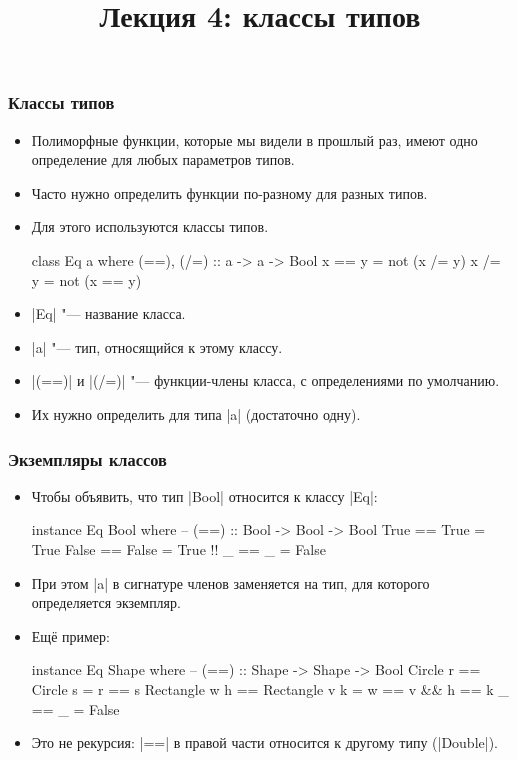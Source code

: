 \documentclass[10pt]{beamer}
\title{Лекция 4: классы типов}
\begin{document}
\begin{frame}[plain]
  \maketitle
\end{frame}

\begin{frame}[fragile]
  \frametitle{Классы типов}
  \begin{itemize}
    \item Полиморфные функции, которые мы видели в прошлый раз, имеют одно определение для любых параметров типов.
    \item Часто нужно определить функции по-разному для разных типов.
    \item Для этого используются классы типов.
          \begin{haskell}
            class Eq a where
                (==), (/=) :: a -> a -> Bool
                x == y = not (x /= y)
                x /= y = not (x == y)
          \end{haskell}
    \item \haskinline|Eq| "--- название класса.
    \item \haskinline|a| "--- тип, относящийся к этому классу.
    \item \haskinline|(==)| и \haskinline|(/=)| "--- функции-члены класса, с определениями по умолчанию.
    \item Их нужно определить для типа \haskinline|a| \pause(достаточно одну).
  \end{itemize}
\end{frame}

\begin{frame}[fragile]
  \frametitle{Экземпляры классов}
  \begin{itemize}
    \item Чтобы объявить, что тип \haskinline|Bool| относится к классу \haskinline|Eq|:
          \begin{haskell}
            instance Eq Bool where
                -- (==) :: Bool -> Bool -> Bool
                True == True = True
                False == False = True !\pause!
                _ == _ = False
          \end{haskell}
    \item При этом \haskinline|a| в сигнатуре членов заменяется на тип, для которого определяется экземпляр.
    \item Ещё пример:\pause
          \begin{haskell}
            instance Eq Shape where
                -- (==) :: Shape -> Shape -> Bool
                Circle r == Circle s = r == s
                Rectangle w h == Rectangle v k = w == v && h == k
                _ == _ = False
          \end{haskell}
    \item<4-> Это не рекурсия: \haskinline|==| в правой части относится к другому типу (\haskinline|Double|).
  \end{itemize}
\end{frame}
\end{document}
